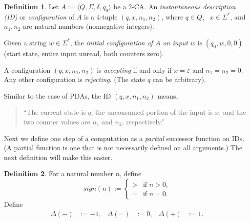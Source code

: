 \documentclass[11pt]{article}
\newcommand{\emptystr}{\varepsilon}
\newcommand{\tuple}[1]{{\langle{#1}\rangle}}
\newcommand{\syg}{\mathord{>}}
\newcommand{\sye}{\mathord{=}}
\newcommand{\syp}{\mathord{+}}
\newcommand{\sym}{\mathord{-}}
\newcommand{\sign}{\mathord{\textit{sign}}}
\theoremstyle{definition}
\newtheorem{definition}{Definition}
\begin{document}
\begin{definition}\label{def:2ca}
Let $A := \tuple{Q,\Sigma,\delta,q_0}$ be a $2$-CA\@.  An \emph{instantaneous description (ID)} or \emph{configuration} of $A$ is a $4$-tuple $(q,x,n_1,n_2)$, where $q\in Q$, \ $x\in\Sigma^*$, and $n_1,n_2$ are natural numbers (nonnegative integers).

Given a string $w\in\Sigma^*$, the \emph{initial configuration of $A$ on input $w$} is $(q_0,w,0,0)$ (start state, entire input unread, both counters zero).

A configuration $(q,x,n_1,n_2)$ is \emph{accepting} if and only if $x = \emptystr$ and $n_1 = n_2 = 0$.  Any other configuration is \emph{rejecting}.  (The state $q$ can be arbitrary).
\end{definition}

Similar to the case of PDAs, the ID $(q,x,n_1,n_2)$ means,
\begin{quote}
``The current state is $q$, the unconsumed portion of the input is $x$, and the two counter values are $n_1$ and $n_2$, respectively.''
\end{quote}

Next we define one step of a computation as a \emph{partial} successor function on IDs.  (A partial function is one that is not necessarily defined on all arguments.)  The next definition will make this easier.

\begin{definition}
For a natural number $n$, define
\[ \sign(n) := \begin{cases}
\syg & \mbox{if $n>0$,} \\
\sye & \mbox{if $n=0$.}
\end{cases} \]
Define
\begin{align*}
\Delta(\sym) &:= -1, & \Delta(\sye) &:= 0, & \Delta(\syp) &:= 1.
\end{align*}
\end{definition}
\end{document}
